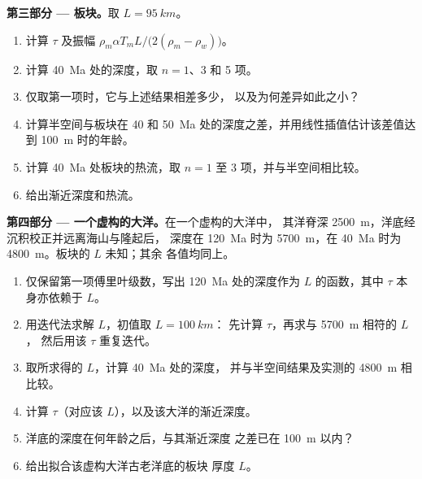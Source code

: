 \begin{problem}
\medskip\noindent\textbf{第三部分 --- 板块。}取 $L = \qty{95}{km}$。
\begin{enumerate}[resume]
  \item 计算 $\tau$ 及振幅 $\rho_m\alpha T_mL/\bigl(2(\rho_m -
        \rho_w)\bigr)$。
  \item 计算 \qty{40}{Ma} 处的深度，取 $n = 1$、3 和 5 项。
  \item 仅取第一项时，它与上述结果相差多少，
        以及为何差异如此之小？
  \item 计算半空间与板块在 40 和
        \qty{50}{Ma} 处的深度之差，并用线性插值估计该差值达到
        \qty{100}{m} 时的年龄。
  \item 计算 \qty{40}{Ma} 处板块的热流，取
        $n = 1$ 至 3 项，并与半空间相比较。
  \item 给出渐近深度和热流。
\end{enumerate}

\medskip\noindent\textbf{第四部分 --- 一个虚构的大洋。}在一个虚构的大洋中，
其洋脊深 \qty{2500}{m}，洋底经沉积校正并远离海山与隆起后，
深度在 \qty{120}{Ma} 时为 \qty{5700}{m}，在
\qty{40}{Ma} 时为 \qty{4800}{m}。板块的 $L$ 未知；其余
各值均同上。
\begin{enumerate}[resume]
  \item 仅保留第一项傅里叶级数，写出
        \qty{120}{Ma} 处的深度作为 $L$ 的函数，其中
        $\tau$ 本身亦依赖于 $L$。
  \item 用迭代法求解 $L$，初值取 $L = \qty{100}{km}$：
        先计算 $\tau$，再求与 \qty{5700}{m} 相符的 $L$，
        然后用该 $\tau$ 重复迭代。
  \item 取所求得的 $L$，计算 \qty{40}{Ma} 处的深度，
        并与半空间结果及实测的 \qty{4800}{m} 相比较。
  \item 计算 $\tau$（对应该 $L$），以及该大洋的渐近深度。
  \item 洋底的深度在何年龄之后，与其渐近深度
        之差已在 \qty{100}{m} 以内？
  \item 给出拟合该虚构大洋古老洋底的板块
        厚度 $L$。
\end{enumerate}
\end{problem}
